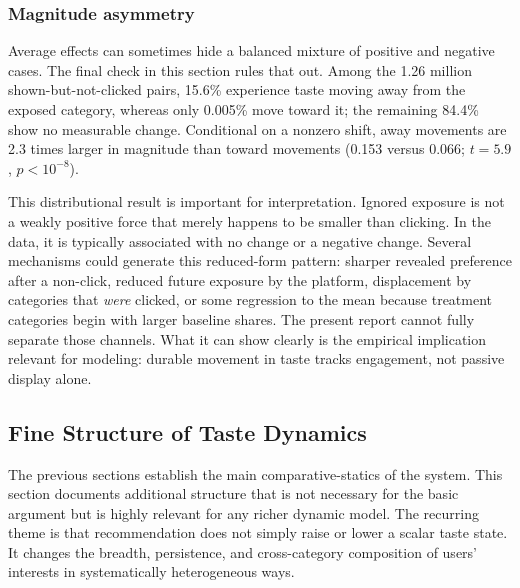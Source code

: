 \documentclass[11pt]{article}
\begin{document}
\subsubsection{Magnitude asymmetry}

Average effects can sometimes hide a balanced mixture of positive and negative cases. The final check in this section rules that out. Among the 1.26 million shown-but-not-clicked pairs, 15.6\% experience taste moving away from the exposed category, whereas only 0.005\% move toward it; the remaining 84.4\% show no measurable change. Conditional on a nonzero shift, away movements are 2.3 times larger in magnitude than toward movements (0.153 versus 0.066; $t = 5.9$, $p < 10^{-8}$).

This distributional result is important for interpretation. Ignored exposure is not a weakly positive force that merely happens to be smaller than clicking. In the data, it is typically associated with no change or a negative change. Several mechanisms could generate this reduced-form pattern: sharper revealed preference after a non-click, reduced future exposure by the platform, displacement by categories that \emph{were} clicked, or some regression to the mean because treatment categories begin with larger baseline shares. The present report cannot fully separate those channels. What it can show clearly is the empirical implication relevant for modeling: durable movement in taste tracks engagement, not passive display alone.


\subsection{Fine Structure of Taste Dynamics}
\label{sec:fine}

The previous sections establish the main comparative-statics of the system. This section documents additional structure that is not necessary for the basic argument but is highly relevant for any richer dynamic model. The recurring theme is that recommendation does not simply raise or lower a scalar taste state. It changes the breadth, persistence, and cross-category composition of users' interests in systematically heterogeneous ways.
\end{document}
